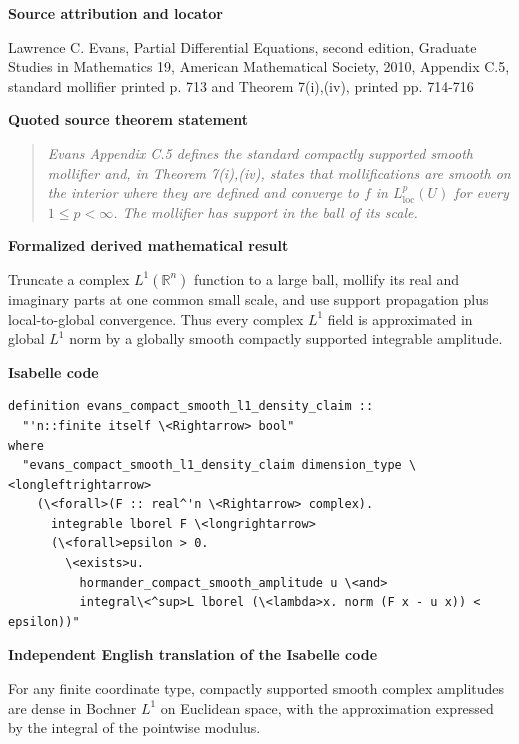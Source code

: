 \documentclass[10pt,oneside]{article}
\newenvironment{sourcequote}{\begin{quote}\itshape}{\end{quote}}
\newcommand{\reviewlabel}[1]{\par\smallskip\noindent\textsf{\bfseries #1}\par\smallskip}
\begin{document}
\reviewlabel{Source attribution and locator}
Lawrence C. Evans, Partial Differential Equations, second edition, Graduate Studies in Mathematics 19, American Mathematical Society, 2010, Appendix C.5, standard mollifier printed p. 713 and Theorem 7(i),(iv), printed pp. 714-716

\reviewlabel{Quoted source theorem statement}
\begin{sourcequote}
Evans Appendix C.5 defines the standard compactly supported smooth mollifier and, in Theorem 7(i),(iv), states that mollifications are smooth on the interior where they are defined and converge to $f$ in $L^p_{\mathrm{loc}}(U)$ for every $1\leq p<\infty$. The mollifier has support in the ball of its scale.
\end{sourcequote}

\reviewlabel{Formalized derived mathematical result}
Truncate a complex $L^1(\mathbb R^n)$ function to a large ball, mollify its real and imaginary parts at one common small scale, and use support propagation plus local-to-global convergence. Thus every complex $L^1$ field is approximated in global $L^1$ norm by a globally smooth compactly supported integrable amplitude.

\reviewlabel{Isabelle code}
\begin{lstlisting}
definition evans_compact_smooth_l1_density_claim ::
  "'n::finite itself \<Rightarrow> bool"
where
  "evans_compact_smooth_l1_density_claim dimension_type \<longleftrightarrow>
    (\<forall>(F :: real^'n \<Rightarrow> complex).
      integrable lborel F \<longrightarrow>
      (\<forall>epsilon > 0.
        \<exists>u.
          hormander_compact_smooth_amplitude u \<and>
          integral\<^sup>L lborel (\<lambda>x. norm (F x - u x)) < epsilon))"
\end{lstlisting}

\reviewlabel{Independent English translation of the Isabelle code}
For any finite coordinate type, compactly supported smooth complex amplitudes are dense in Bochner $L^1$ on Euclidean space, with the approximation expressed by the integral of the pointwise modulus.
\end{document}
